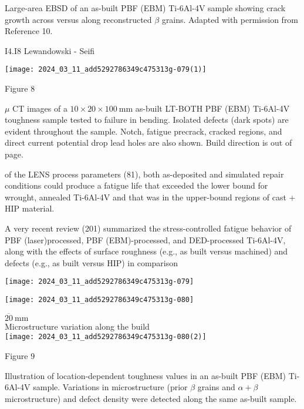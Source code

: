 \documentclass[10pt]{article}
\begin{document}
Large-area EBSD of an as-built PBF (EBM) Ti-6Al-4V sample showing crack growth across versus along reconstructed $\beta$ grains. Adapted with permission from Reference 10.

I4.I8 Lewandowski - Seifi

\begin{center}
\texttt{[image: 2024\_03\_11\_add5292786349c475313g-079(1)]}
\end{center}

Figure 8

$\mu$ CT images of a $10 \times 20 \times 100 \mathrm{~mm}$ as-built LT-BOTH PBF (EBM) Ti-6Al-4V toughness sample tested to failure in bending. Isolated defects (dark spots) are evident throughout the sample. Notch, fatigue precrack, cracked regions, and direct current potential drop lead holes are also shown. Build direction is out of page.

of the LENS process parameters (81), both as-deposited and simulated repair conditions could produce a fatigue life that exceeded the lower bound for wrought, annealed Ti-6Al-4V and that was in the upper-bound regions of cast + HIP material.

A very recent review (201) summarized the stress-controlled fatigue behavior of PBF (laser)processed, PBF (EBM)-processed, and DED-processed Ti-6Al-4V, along with the effects of surface roughness (e.g., as built versus machined) and defects (e.g., as built versus HIP) in comparison

\begin{center}
\texttt{[image: 2024\_03\_11\_add5292786349c475313g-079]}
\end{center}

\begin{center}
\texttt{[image: 2024\_03\_11\_add5292786349c475313g-080]}
\end{center}

$\overline{20} \mathrm{~mm}$\\
Microstructure variation along the build\\
\texttt{[image: 2024\_03\_11\_add5292786349c475313g-080(2)]}

Figure 9

Illustration of location-dependent toughness values in an as-built PBF (EBM) Ti-6Al-4V sample. Variations in microstructure (prior $\beta$ grains and $\alpha+\beta$ microstructure) and defect density were detected along the same as-built sample.
\end{document}
